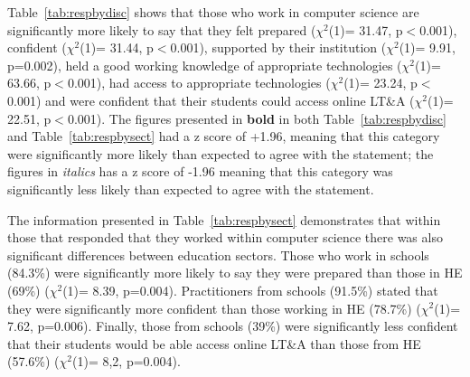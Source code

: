 \documentclass[conference]{IEEEtran}
\begin{document}
Table~\ref{tab:respbydisc} shows that those who work in computer
science are significantly more likely to say that they felt prepared
($\chi^2$(1)= 31.47, p$<$0.001), confident ($\chi^2$(1)= 31.44,
p$<$0.001), supported by their institution ($\chi^2$(1)= 9.91, p=0.002),
held a good working knowledge of appropriate technologies
($\chi^2$(1)= 63.66, p$<$0.001), had access to appropriate technologies
($\chi^2$(1)= 23.24, p$<$0.001) and were confident that their students
could access online LT\&A ($\chi^2$(1)= 22.51, p$<$0.001). The figures
presented in {\textbf{bold}} in both Table~\ref{tab:respbydisc} and
Table~\ref{tab:respbysect} had a z score of +1.96, meaning that this
category were significantly more likely than expected to agree with
the statement; the figures in {\emph{italics}} has a z score of -1.96
meaning that this category was significantly less likely than expected
to agree with the statement.



The information presented in Table~\ref{tab:respbysect} demonstrates
that within those that responded that they worked within computer
science there was also significant differences between education
sectors. Those who work in schools (84.3\%) were significantly more
likely to say they were prepared than those in HE (69\%) ($\chi^2$(1)=
8.39, p=0.004). Practitioners from schools (91.5\%) stated that they
were significantly more confident than those working in HE (78.7\%)
($\chi^2$(1)= 7.62, p=0.006). Finally, those from schools (39\%) were
significantly less confident that their students would be able access
online LT\&A than those from HE (57.6\%) ($\chi^2$(1)= 8,2,
p=0.004).

\end{document}
